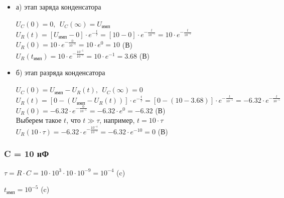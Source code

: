 \begin{itemize}
\item[] а) этап заряда конденсатора

		$U_C(0)	= 0,\ \ U_C(\infty) = U_\text{имп}$\\
		$U_R(t) = [U_\text{имп} - 0] \cdot e^{-\frac{t}{\tau}} = [10 - 0] \cdot e^{-\frac{t}{10^{-5}}} = 10 \cdot e^{-\frac{t}{10^{-5}}}$\\
		$U_R(0) = 10 \cdot e^{-\frac{0}{10^{-5}}} = 10 \cdot e^0 = 10$ (В)\\
		$U_R(t_\text{имп}) = 10 \cdot e^{-\frac{10^{-5}}{10^{-5}}} = 10 \cdot e^{-1} = 3.68$ (В)\\

\item[] б) этап разряда конденсатора

		$U_C(0)	= U_\text{имп} - U_R(t),\ \ U_C(\infty) = 0$\\
		$U_R(t) = [0 - (U_\text{имп} - U_R(t))] \cdot e^{-\frac{t}{\tau}} = [0 - (10 - 3.68)] \cdot e^{-\frac{t}{10^{-5}}} = -6.32 \cdot e^{-\frac{t}{10^{-5}}}$\\
		$U_R(0) = -6.32 \cdot e^{-\frac{0}{10^{-5}}} = -6.32 \cdot e^0 = -6.32$ (В)\\
		Выберем такое $t$, что $t \gg \tau$, например, $t = 10 \cdot \tau$ \\
		$U_R(10 \cdot \tau)	= -6.32 \cdot e^{-\frac{10^{-4}}{10^{-5}}} = -6.32 \cdot e^{-10} = 0$ (В)\\
		
\end{itemize}

\subsubsection{C = 10 нФ}

		$\tau = R \cdot C = 10 \cdot 10^3 \cdot 10 \cdot 10^{-9} = 10^{-4}$ (c)
		
		$t_\text{имп} = 10^{-5}$ (c)

